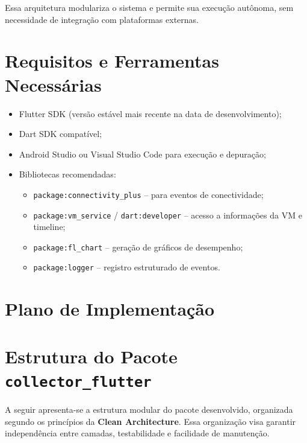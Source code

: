 \documentclass[12pt,a4paper,oneside]{abntex2}
\begin{document}
Essa arquitetura modulariza o sistema e permite sua execução autônoma, sem necessidade de integração com plataformas externas.

\section{Requisitos e Ferramentas Necessárias}

\begin{itemize}
  \item Flutter SDK (versão estável mais recente na data de desenvolvimento);
  \item Dart SDK compatível;
  \item Android Studio ou Visual Studio Code para execução e depuração;
  \item Bibliotecas recomendadas:
    \begin{itemize}
      \item \texttt{package:connectivity\_plus} – para eventos de conectividade;
      \item \texttt{package:vm\_service} / \texttt{dart:developer} – acesso a informações da VM e timeline;
      \item \texttt{package:fl\_chart} – geração de gráficos de desempenho;
      \item \texttt{package:logger} – registro estruturado de eventos.
    \end{itemize}
\end{itemize}

\section{Plano de Implementação}

\section{Estrutura do Pacote \texttt{collector\_flutter}}

A seguir apresenta-se a estrutura modular do pacote desenvolvido, organizada segundo os princípios da \textbf{Clean Architecture}. Essa organização visa garantir independência entre camadas, testabilidade e facilidade de manutenção.
\end{document}

